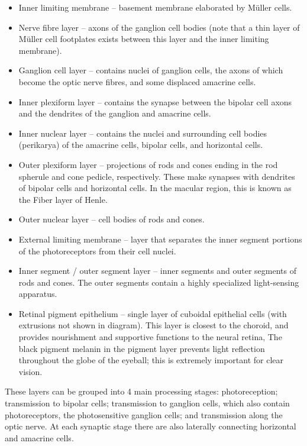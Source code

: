 \documentclass[]{book}
\providecommand{\tightlist}{%
  \setlength{\itemsep}{0pt}\setlength{\parskip}{0pt}}
\begin{document}
\begin{itemize}
\tightlist
\item
  Inner limiting membrane -- basement membrane elaborated by Müller cells.
\item
  Nerve fibre layer -- axons of the ganglion cell bodies (note that a thin layer of Müller cell footplates exists between this layer and the inner limiting membrane).
\item
  Ganglion cell layer -- contains nuclei of ganglion cells, the axons of which become the optic nerve fibres, and some displaced amacrine cells.
\item
  Inner plexiform layer -- contains the synapse between the bipolar cell axons and the dendrites of the ganglion and amacrine cells.
\item
  Inner nuclear layer -- contains the nuclei and surrounding cell bodies (perikarya) of the amacrine cells, bipolar cells, and horizontal cells.
\item
  Outer plexiform layer -- projections of rods and cones ending in the rod spherule and cone pedicle, respectively. These make synapses with dendrites of bipolar cells and horizontal cells. In the macular region, this is known as the Fiber layer of Henle.
\item
  Outer nuclear layer -- cell bodies of rods and cones.
\item
  External limiting membrane -- layer that separates the inner segment portions of the photoreceptors from their cell nuclei.
\item
  Inner segment / outer segment layer -- inner segments and outer segments of rods and cones. The outer segments contain a highly specialized light-sensing apparatus.
\item
  Retinal pigment epithelium -- single layer of cuboidal epithelial cells (with extrusions not shown in diagram). This layer is closest to the choroid, and provides nourishment and supportive functions to the neural retina, The black pigment melanin in the pigment layer prevents light reflection throughout the globe of the eyeball; this is extremely important for clear vision.
\end{itemize}

These layers can be grouped into 4 main processing stages: photoreception; transmission to bipolar cells; transmission to ganglion cells, which also contain photoreceptors, the photosensitive ganglion cells; and transmission along the optic nerve. At each synaptic stage there are also laterally connecting horizontal and amacrine cells.
\end{document}
